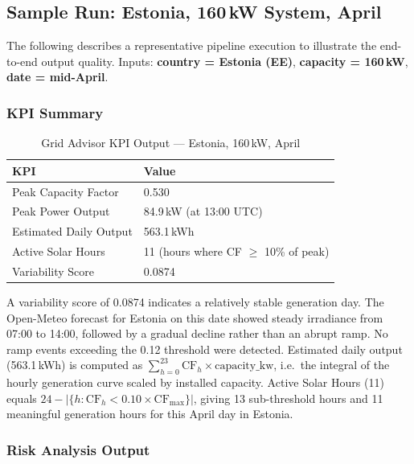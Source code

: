 \documentclass[12pt, a4paper]{article}
\begin{document}
\subsection{Sample Run: Estonia, 160\,kW System, April}

The following describes a representative pipeline execution to illustrate the end-to-end output quality. Inputs: \textbf{country = Estonia (EE)}, \textbf{capacity = 160\,kW}, \textbf{date = mid-April}.

\subsubsection{KPI Summary}

\begin{table}[H]
    \centering
    \caption{Grid Advisor KPI Output --- Estonia, 160\,kW, April}
    \begin{tabular}{ll}
        \toprule
        \textbf{KPI} & \textbf{Value} \\
        \midrule
        Peak Capacity Factor & 0.530 \\
        Peak Power Output & 84.9\,kW (at 13:00 UTC) \\
        Estimated Daily Output & 563.1\,kWh \\
        Active Solar Hours & 11 (hours where CF $\geq$ 10\% of peak) \\
        Variability Score & 0.0874 \\
        \bottomrule
    \end{tabular}
\end{table}

A variability score of 0.0874 indicates a relatively stable generation day. The Open-Meteo forecast for Estonia on this date showed steady irradiance from 07:00 to 14:00, followed by a gradual decline rather than an abrupt ramp. No ramp events exceeding the 0.12 threshold were detected. Estimated daily output (563.1\,kWh) is computed as $\sum_{h=0}^{23} \text{CF}_h \times \text{capacity\_kw}$, i.e.\ the integral of the hourly generation curve scaled by installed capacity. Active Solar Hours (11) equals $24 - |\{h : \text{CF}_h < 0.10 \times \text{CF}_{\max}\}|$, giving 13 sub-threshold hours and 11 meaningful generation hours for this April day in Estonia.

\clearpage
\subsubsection{Risk Analysis Output}
\end{document}
